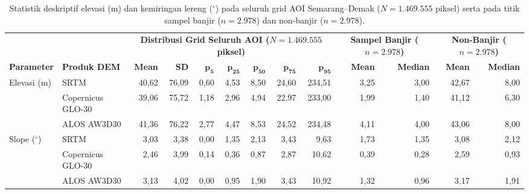 \documentclass[11pt,twoside]{article}
\begin{document}
\begin{table}[!htbp]
\small
\centering
\caption{Statistik deskriptif elevasi (m) dan kemiringan lereng ($^\circ$) pada seluruh grid AOI Semarang--Demak ($N = 1.469.555$ piksel) serta pada titik sampel banjir ($n=2.978$) dan non-banjir ($n=2.978$).}
\label{tab:dem-stats-id}
\begin{adjustbox}{max width=\textwidth}
\begin{tabular}{ll rrrrrrr rr rr}
\toprule
& & \multicolumn{7}{c}{\textbf{Distribusi Grid Seluruh AOI ($N = 1.469.555$ piksel)}} & \multicolumn{2}{c}{\textbf{Sampel Banjir ($n=2.978$)}} & \multicolumn{2}{c}{\textbf{Non-Banjir ($n=2.978$)}} \\
\cmidrule(lr){3-9} \cmidrule(lr){10-11} \cmidrule(lr){12-13}
\textbf{Parameter} & \textbf{Produk DEM} & \textbf{Mean} & \textbf{SD} & $\boldsymbol{p_5}$ & $\boldsymbol{p_{25}}$ & $\boldsymbol{p_{50}}$ & $\boldsymbol{p_{75}}$ & $\boldsymbol{p_{95}}$ & \textbf{Mean} & \textbf{Median} & \textbf{Mean} & \textbf{Median} \\
\midrule
Elevasi (m) & SRTM & 40,62 & 76,09 & 0,60 & 4,53 & 8,50 & 24,60 & 234,51 & 3,25 & 3,00 & 42,67 & 8,00 \\
            & Copernicus GLO-30 & 39,06 & 75,72 & 1,18 & 2,96 & 4,94 & 22,97 & 233,00 & 1,99 & 1,40 & 41,12 & 6,30 \\
            & ALOS AW3D30 & 41,36 & 76,22 & 2,77 & 4,47 & 8,53 & 24,52 & 234,48 & 4,11 & 4,00 & 43,06 & 8,00 \\
\midrule
Slope ($^\circ$) & SRTM & 3,03 & 3,38 & 0,00 & 1,35 & 2,13 & 3,43 & 9,63 & 1,73 & 1,35 & 3,08 & 2,12 \\
                 & Copernicus GLO-30 & 2,46 & 3,99 & 0,14 & 0,36 & 0,87 & 2,87 & 10,62 & 0,39 & 0,28 & 2,59 & 0,93 \\
                 & ALOS AW3D30 & 3,13 & 4,02 & 0,00 & 0,95 & 1,90 & 3,43 & 10,92 & 1,32 & 0,96 & 3,17 & 1,91 \\
\bottomrule
\end{tabular}
\end{adjustbox}
\end{table}
\end{document}

